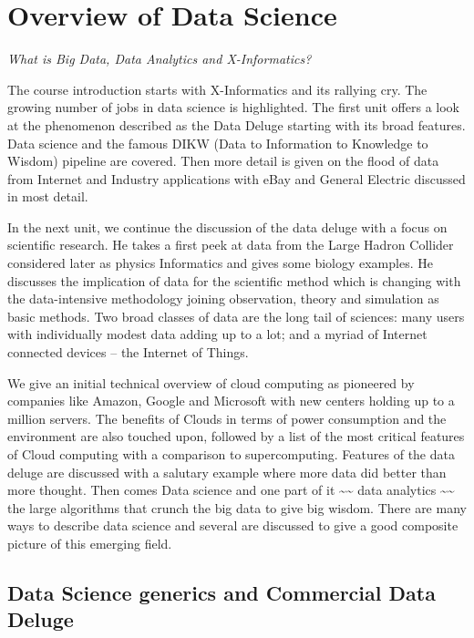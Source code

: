 \begin{fileremark}\currfiledir \currfilename\end{fileremark}

\section{Overview of Data Science}\label{overview-of-data-science}

\emph{What is Big Data, Data Analytics and X-Informatics?}

The course introduction starts with X-Informatics and its rallying cry.
The growing number of jobs in data science is highlighted. The first
unit offers a look at the phenomenon described as the Data Deluge
starting with its broad features. Data science and the famous DIKW (Data
to Information to Knowledge to Wisdom) pipeline are covered. Then more
detail is given on the flood of data from Internet and Industry
applications with eBay and General Electric discussed in most detail.

In the next unit, we continue the discussion of the data deluge with a
focus on scientific research. He takes a first peek at data from the
Large Hadron Collider considered later as physics Informatics and gives
some biology examples. He discusses the implication of data for the
scientific method which is changing with the data-intensive methodology
joining observation, theory and simulation as basic methods. Two broad
classes of data are the long tail of sciences: many users with
individually modest data adding up to a lot; and a myriad of Internet
connected devices -- the Internet of
Things.

We give an initial technical overview of cloud computing as pioneered by
companies like Amazon, Google and Microsoft with new centers holding up
to a million servers. The benefits of Clouds in terms of power
consumption and the environment are also touched upon, followed by a
list of the most critical features of Cloud computing with a comparison
to supercomputing. Features of the data deluge are discussed with a
salutary example where more data did better than more thought. Then
comes Data science and one part of it \textasciitilde{}\textasciitilde{}
data analytics \textasciitilde{}\textasciitilde{} the large algorithms
that crunch the big data to give big wisdom. There are many ways to
describe data science and several are discussed to give a good composite
picture of this emerging field.

\subsection{Data Science generics and Commercial Data
Deluge}\label{data-science-generics-and-commercial-data-deluge}

